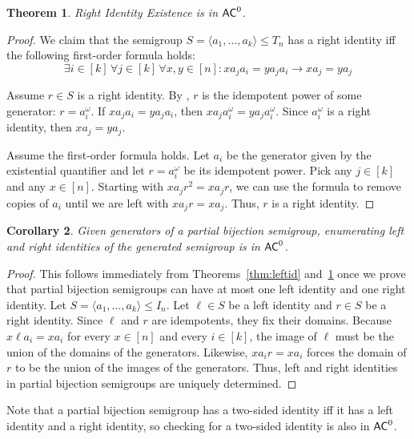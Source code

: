 \documentclass{amsart}
\newcommand{\AC}{\ensuremath\mathsf{AC}}
\newtheorem{theorem}{Theorem}[section]
\newtheorem{corollary}[theorem]{Corollary}
\theoremstyle{remark}
\numberwithin{equation}{section}
\begin{document}
\begin{theorem} \label{thm:rightid}
Right Identity Existence is in $\AC^0$.
\end{theorem}
\begin{proof}
We claim that the semigroup $S = \langle a_1,\dots,a_k\rangle \leq T_n$ has a right identity iff the following first-order formula holds:
\[ \exists i \in [k] \, \forall j \in [k] \, \forall x,y \in [n]: x a_j a_i = y a_j a_i \rightarrow x a_j = y a_j \]

Assume $r \in S$ is a right identity. By \cite[Lemma 6.3]{FJ:CP}, $r$ is the idempotent power of some generator: $r = a_i^\omega$. If $xa_j a_i = y a_j a_i$, then $xa_j a_i^\omega = y a_j a_i^\omega$. Since $a_i^\omega$ is a right identity, then $xa_j = y a_j$.

Assume the first-order formula holds. Let $a_i$ be the generator given by the existential quantifier and let $r = a_i^\omega$ be its idempotent power. Pick any $j \in [k]$ and any $x \in [n]$. Starting with $xa_jr^2 = xa_jr$, we can use the formula to remove copies of $a_i$ until we are left with $xa_jr = xa_j$. Thus, $r$ is a right identity.
\end{proof}

\pagebreak

\begin{corollary}
Given generators of a partial bijection semigroup, enumerating left and right identities of the generated semigroup is in $\AC^0$.
\end{corollary}
\begin{proof}
This follows immediately from Theorems~\ref{thm:leftid} and~\ref{thm:rightid} once we prove that partial bijection semigroups can have at most one left identity and one right identity. Let $S = \langle a_1,\dots,a_k \rangle \leq I_n$. Let $\ell \in S$ be a left identity and $r \in S$ be a right identity. Since $\ell$ and $r$ are idempotents, they fix their domains. Because $x \ell a_i = x a_i$ for every $x \in [n]$ and every $i \in [k]$, the image of $\ell$ must be the union of the domains of the generators. Likewise, $x a_i r = x a_i$ forces the domain of $r$ to be the union of the images of the generators. Thus, left and right identities in partial bijection semigroups are uniquely determined.
\end{proof}

Note that a partial bijection semigroup has a two-sided identity iff it has a left identity and a right identity, so checking for a two-sided identity is also in $\AC^0$.
\end{document}
